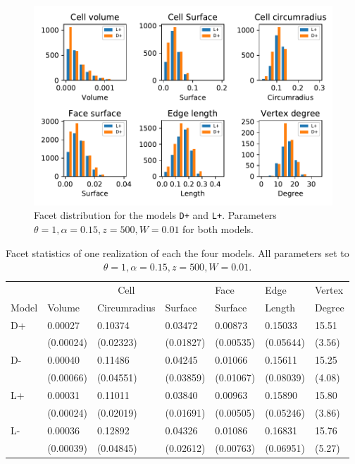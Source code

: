 \begin{figure}
  \centering
    \includegraphics[width=1\textwidth]{../img/numeric/facets_L+_D+.pdf}
  \caption{Facet distribution for the models \texttt{D+} and \texttt{L+}. Parameters $\theta = 1,\alpha = 0.15, z=500, W=0.01$ for both models.}
\end{figure}


\begin{table}\centering
{}
\begin{tabular}{lllllll}\toprule
& \multicolumn{3}{c}{Cell} & Face & Edge & Vertex \\
\cmidrule(lr){2-4} \cmidrule(lr){5-5} \cmidrule(lr){6-6} \cmidrule(lr){7-7}
Model & Volume & Circumradius & Surface & Surface & Length & Degree \\
\midrule
D+ &  0.00027 & 0.10374 & 0.03472 & 0.00873 & 0.15033 & 15.51\\
&  (0.00024) &  (0.02323) &  (0.01827) &  (0.00535) &  (0.05644) &  (3.56) \\
D- &  0.00040 & 0.11486 & 0.04245 & 0.01066 & 0.15611 & 15.25\\
&  (0.00066) &  (0.04551) &  (0.03859) &  (0.01067) &  (0.08039) &  (4.08) \\
L+ &  0.00031 & 0.11011 & 0.03840 & 0.00963 & 0.15890 & 15.80\\
&  (0.00024) &  (0.02019) &  (0.01691) &  (0.00505) &  (0.05246) &  (3.86) \\
L- &  0.00036 & 0.12892 & 0.04326 & 0.01086 & 0.16831 & 15.76\\
&  (0.00039) &  (0.04845) &  (0.02612) &  (0.00763) &  (0.06951) &  (5.27) \\
\bottomrule
\end{tabular}
\caption{Facet statistics of one realization of each the four models. All parameters set to $\theta = 1, \alpha = 0.15, z=500, W=0.01$.}

\end{table}

